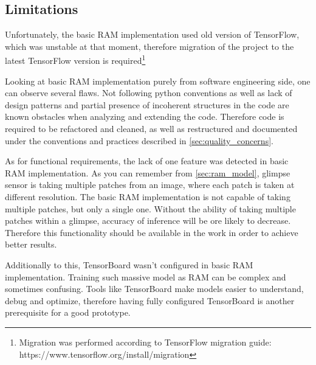\subsection{Limitations}
Unfortunately, the basic RAM implementation used old version of TensorFlow,
which was unstable at that moment, therefore migration of the project
to the latest TensorFlow version is required\footnote{
	Migration was performed according to TensorFlow migration
	guide: https://www.tensorflow.org/install/migration
}

Looking at basic RAM implementation purely from software engineering side,
one can observe several flaws. Not following python conventions as well
as lack of design patterns and partial presence of incoherent structures in the code
are known obstacles when analyzing and extending the code.
Therefore code is required to be refactored and cleaned,
as well as restructured and documented under the conventions and
practices described in \autoref{sec:quality_concerns}.


As for functional requirements, the lack of one feature was detected in basic RAM implementation.
As you can remember from \autoref{sec:ram_model}, glimpse sensor is taking
multiple patches from an image, where each patch is taken at different resolution.
The basic RAM implementation is not capable of taking multiple patches,
but only a single one. Without the ability of taking multiple patches within a glimpse,
accuracy of inference will be ore likely to decrease. Therefore this functionality
should be available in the work in order to achieve better results.

Additionally to this, TensorBoard wasn't configured in basic RAM implementation.
Training such massive model as RAM can be complex and sometimes confusing.
Tools like TensorBoard make models easier to understand, debug
and optimize, therefore having fully configured TensorBoard is another
prerequisite for a good prototype.









